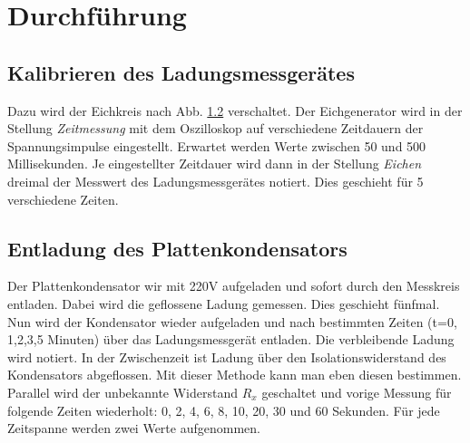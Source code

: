 \documentclass[12pt,a4paper,titlepage,headinclude,bibtotoc]{scrartcl}
\begin{document}
\section{Durchführung}
\label{sec:durchfuehrung}
\subsection{Kalibrieren des Ladungsmessgerätes}
Dazu wird der Eichkreis nach Abb. \ref{} verschaltet.
Der Eichgenerator wird in der Stellung \emph{Zeitmessung} mit dem Oszilloskop auf verschiedene Zeitdauern der Spannungsimpulse eingestellt.
Erwartet werden Werte zwischen 50 und 500 Millisekunden.
Je eingestellter Zeitdauer wird dann in der Stellung \emph{Eichen} dreimal der Messwert des Ladungsmessgerätes notiert.
Dies geschieht für 5 verschiedene Zeiten.

\subsection{Entladung des Plattenkondensators}
Der  Plattenkondensator wir mit 220V aufgeladen und sofort durch den Messkreis entladen.
Dabei wird die geflossene Ladung gemessen.
Dies geschieht fünfmal.\\
Nun wird der Kondensator wieder aufgeladen und nach bestimmten Zeiten (t=0, 1,2,3,5 Minuten) über das Ladungsmessgerät entladen.
Die verbleibende Ladung wird notiert.
In der Zwischenzeit ist Ladung über den Isolationswiderstand des Kondensators abgeflossen.
Mit dieser Methode kann man eben diesen bestimmen.\\
Parallel wird der unbekannte Widerstand $R_x$ geschaltet und vorige Messung für folgende Zeiten wiederholt: 0, 2, 4, 6, 8, 10, 20, 30 und 60 Sekunden.
Für jede Zeitspanne werden zwei Werte aufgenommen.
\end{document}
